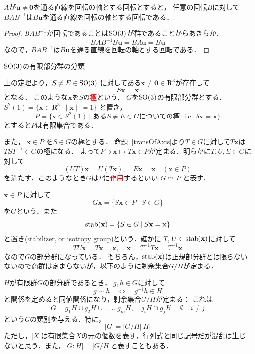 \begin{Prop}\label{transOfAxis}
$A$が$\mathbf u\neq \mathbf 0$を通る直線を回転の軸とする回転とすると，
任意の回転$B$に対して
$BAB^{-1}$は$B\mathbf u$を通る直線を回転の軸とする回転である．
\end{Prop}
\begin{proof}
$BAB^{-1}$が回転であることは$\operatorname{SO}(3)$が群であることからあきらか．
\[
     BAB^{-1}B\mathbf u=BA\mathbf u=B\mathbf u
\]
なので，$BAB^{-1}$は$B\mathbf u$を通る直線を回転の軸とする回転である．
\end{proof}

\begin{Q}
$\operatorname{SO}(3)$の有限部分群の分類
\end{Q}

上の定理より，$S\neq E\in \operatorname{SO}(3)$ に対してある$\mathbf x\neq \mathbf 0\in \mathbf R^3$が存在して
\[ 
     S\mathbf x=\mathbf x
\]
となる．
このような$\mathbf x$を$S$の\textcolor{red}{極}という．
$G$を$\operatorname{SO}(3)$の有限部分群とする．
$S^2(1)=\{\mathbf x\in \mathbf R^3\mid \|\mathbf x\|=1\}$
と置き，
\[
     P
     =
     \{\mathbf x\in S^2(1)\mid 
     \text{ある}S\neq E\in G\text{についての極, i.e.~}
     S\mathbf x=\mathbf x\}
\]
とすると$P$は有限集合である．

また， $\mathbf x\in P$ を$S\in G$の極とする．
命題~\ref{transOfAxis}より$T\in G$に対して$T\mathbf x$は
$TST^{-1}\in G$の極になる．
よって$P\ni\mathbf x\mapsto T\mathbf x\in  P$が定まる．明らかに$T, U,E\in G$に対して
\[
     (UT)\mathbf x=U(T\mathbf x),\quad 
     E\mathbf x=\mathbf x \quad (\mathbf x\in  P)
\]
を満たす．このようなとき$G$は$P$に\textcolor{red}{作用}するといい
$G\curvearrowright P$ と表す．

$\mathbf x\in P$ に対して
\[
     G\mathbf x
     =
     \{S\mathbf x\in P\mid S\in G\}
\]
を$G$という．また
\[
     \operatorname{stab}(\mathbf x)
     =
     \{ S\in G\mid
          S\mathbf x=\mathbf x
     \}
\]
と置き(stabilizer, or  isotropy group)という．確かに
$T$, $U\in \operatorname{stab}(\mathbf x)$に対して
\[
     TU\mathbf x=T\mathbf x=\mathbf x,\quad
     \mathbf x=T^{-1}T\mathbf x=T^{-1}\mathbf x
\]
なので$G$の部分群になっている．
もちろん，$\operatorname{stab}(\mathbf x)$は正規部分群とは限らないないので商群は定まらないが，以下のように剰余集合$G/H$が定まる．
\emptyline

$H$が有限群$G$の部分群であるとき，
$g,h\in G$に対して
\[
      g\sim h \quad 
     \Leftrightarrow \quad
     g^{-1}h\in H
\]
と関係を定めると同値関係になり，剰余集合$G/H$が定まる：
これは
\[
     G = g_1H\cup g_2H\cup \dots \cup g_m H,\quad
     g_iH\cap g_jH = \emptyset 
     \quad i\neq j
\]
という$G$の類別を与える．特に，
\begin{equation}\label{num}
     |G|=|G/H||H|
\end{equation}
ただし，$|X|$は有限集合$X$の元の個数を表す，行列式と同じ記号だが混乱は生じないと思う．また，$|G:H|=|G/H|$と表すこともある．
\emptyline

